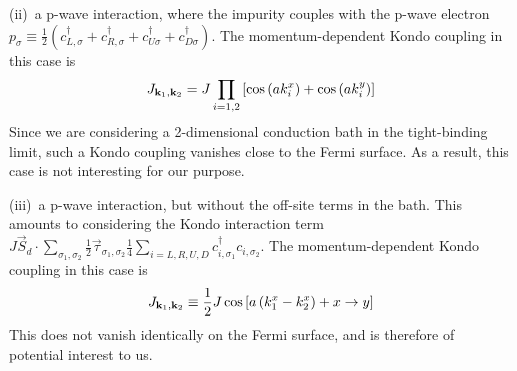 \documentclass{revtex4-2}
\begin{document}
(ii)~a p-wave interaction, where the impurity couples with the p-wave electron \(p_\sigma \equiv \frac{1}{2}\left(c^\dagger_{L,\sigma} + c^\dagger_{R,\sigma} + c^\dagger_{U\sigma} + c^\dagger_{D\sigma}\right)\). The momentum-dependent Kondo coupling in this case is 
\begin{equation}\begin{aligned}\label{J_pwave}
	J_{{\bf k}_1, {\bf k}_2} = J\prod_{i=1,2}\left[\cos\left( ak_i^x \right) + \cos\left( ak_i^y \right) \right]
\end{aligned}\end{equation}
Since we are considering a 2-dimensional conduction bath in the tight-binding limit, such a Kondo coupling vanishes close to the Fermi surface. As a result, this case is not interesting for our purpose.

(iii)~a p-wave interaction, but without the off-site terms in the bath. This amounts to considering the Kondo interaction term \(J\vec{S}_d\cdot\sum_{\sigma_1,\sigma_2}\frac{1}{2}\vec{\tau}_{\sigma_1,\sigma_2}\frac{1}{4}\sum_{i=L,R,U,D}c^\dagger_{i,\sigma_1}c_{i,\sigma_2}\). The momentum-dependent Kondo coupling in this case is 
\begin{equation}\begin{aligned}\label{J_pwave_nooffsite}
	J_{{\bf k}_1, {\bf k}_2} \equiv \frac{1}{2}J \cos\left[ a\left( k_1^x - k_2^x \right) + x\to y \right]
\end{aligned}\end{equation}
This does not vanish identically on the Fermi surface, and is therefore of potential interest to us.
\end{document}
